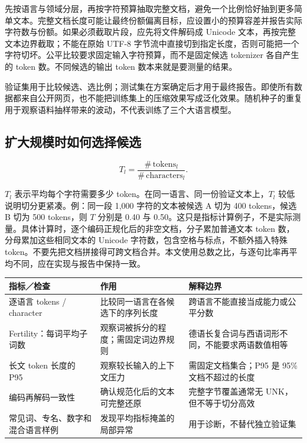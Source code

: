 \documentclass[11pt,a4paper]{article}
\newlength{\BpeDocTableWidth}
\newcommand{\BpeDocCodeInline}[1]{{\ttfamily #1}}
\newcommand{\BpeDocSubsection}[2]{\subsection{\texorpdfstring{#1}{#2}}}
\begin{document}
先按语言与领域分层，再按字符预算抽取完整文档，避免一个比例恰好抽到更多简单文本。完整文档长度可能让最终份额偏离目标，应设置小的预算容差并报告实际字符数与份额。如果必须截取片段，应先将文件解码成 Unicode 文本，再按完整文本边界截取；不能在原始 UTF-8 字节流中直接切到指定长度，否则可能把一个字符切坏。公平比较要求固定输入字符预算，而不是固定候选 tokenizer 各自产生的 \BpeDocCodeInline{token} 数。不同候选的输出 \BpeDocCodeInline{token} 数本来就是要测量的结果。


验证集用于比较候选、选比例；测试集在方案确定后才用于最终报告。即使所有数据都来自公开网页，也不能把训练集上的压缩效果写成泛化效果。随机种子的重复用于观察语料抽样带来的波动，不代表训练了三个大语言模型。


\BpeDocSubsection{扩大规模时如何选择候选}{扩大规模时如何选择候选}


\begin{equation}\label{eq:tokens-per-character}
T_l=\frac{\#\,\mathrm{tokens}_l}{\#\,\mathrm{characters}_l}.
\end{equation}


\(T_l\) 表示平均每个字符需要多少 \BpeDocCodeInline{token}。在同一语言、同一份验证文本上，\(T_l\) 较低说明切分更紧凑。例：同一段 1,000 字符的文本被候选 A 切为 400 tokens，候选 B 切为 500 tokens，则 \(T\) 分别是 0.40 与 0.50。这只是指标计算例子，不是实际测量。具体计算时，逐个编码正规化后的非空文档，分子累加普通文本 \BpeDocCodeInline{token} 数，分母累加这些相同文本的 Unicode 字符数，包含空格与标点，不额外插入特殊 \BpeDocCodeInline{token}。不要先把文档拼接得可跨文档合并。本文使用总数之比，与逐句比率再平均不同，应在实现与报告中保持一致。


\begingroup\fontsize{9.3}{12.7}\selectfont{}
\setlength{\BpeDocTableWidth}{\dimexpr\linewidth-6\tabcolsep\relax}
\renewcommand{\arraystretch}{1.15}
\par\addvspace{0.45em}
\noindent\begin{minipage}{\linewidth}
\begin{tabular}{>{\raggedright\arraybackslash}p{0.230000\BpeDocTableWidth}>{\raggedright\arraybackslash}p{0.385000\BpeDocTableWidth}>{\raggedright\arraybackslash}p{0.385000\BpeDocTableWidth}}
\toprule
\textbf{指标／检查} & \textbf{作用} & \textbf{解释边界} \\

\midrule
逐语言 tokens / character & 比较同一语言在各候选下的序列长度 & 跨语言不能直接当成能力或公平分数 \\[3pt]
Fertility：每词平均子词数 & 观察词被拆分的程度；需固定词边界规则 & 德语长复合词与西语词形不同，不能要求两语数值相等 \\[3pt]
长文 \BpeDocCodeInline{token} 长度的 P95 & 观察较长输入的上下文压力 & 需固定文档集合；P95 是 95\% 文档不超过的长度 \\[3pt]
编码再解码一致性 & 确认规范化后的文本可完整还原 & 完整字节覆盖通常无 UNK，但不等于切分高效 \\[3pt]
常见词、专名、数字和混合语言样例 & 发现平均指标掩盖的局部异常 & 用于诊断，不替代独立验证集 \\[3pt]
\bottomrule
\end{tabular}
\end{minipage}\par\addvspace{0.65em}
\endgroup
\end{document}

